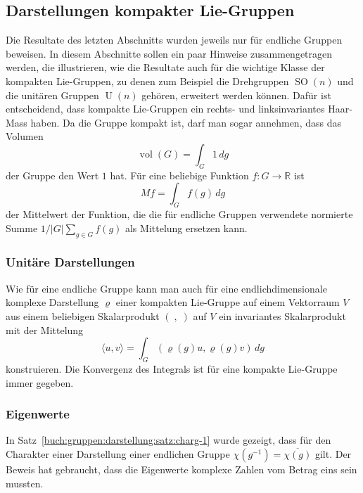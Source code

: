 %
%
%

%
%
\subsection{Darstellungen kompakter Lie-Gruppen}
Die Resultate des letzten Abschnitts wurden jeweils nur für endliche Gruppen
beweisen.
In diesem Abschnitte sollen ein paar Hinweise zusammengetragen werden,
die illustrieren, wie die Resultate auch für die wichtige Klasse
der kompakten Lie-Gruppen, zu denen zum Beispiel die Drehgruppen
$\operatorname{SO}(n)$ und die unitären Gruppen $\operatorname{U}(n)$
gehören, erweitert werden können.
Dafür ist entscheidend, dass kompakte Lie-Gruppen ein rechts- und
linksinvariantes Haar-Mass haben.
Da die Gruppe kompakt ist, darf man sogar annehmen, dass das
Volumen
\[
\operatorname{vol}(G)
=
\int_G 1\, dg
\]
der Gruppe den Wert $1$ hat.
Für eine beliebige Funktion $f\colon G\to \mathbb{R}$ ist
\[
Mf
=
\int_G f(g)\,dg
\]
der Mittelwert der Funktion, die die für endliche Gruppen verwendete
normierte Summe $1/|G| \sum_{g\in G}f(g)$ als Mittelung ersetzen kann.

%
%
\subsubsection{Unitäre Darstellungen}
Wie für eine endliche Gruppe kann man auch für eine endlichdimensionale
komplexe Darstellung $\varrho$ einer kompakten Lie-Gruppe auf einem
Vektorraum $V$ aus einem beliebigen Skalarprodukt $(\;,\;)$ auf $V$
ein invariantes Skalarprodukt mit der Mittelung
\begin{equation}
\langle u,v\rangle
=
\int_G (\varrho(g)u,\varrho(g)v)\,dg
\label{buch:gruppen:darstellungen:eqn:invskalarprodukt}
\end{equation}
konstruieren.
Die Konvergenz des Integrals ist für eine kompakte Lie-Gruppe immer 
gegeben.


%
%
\subsubsection{Eigenwerte}
In Satz~\ref{buch:gruppen:darstellung:satz:charg-1} wurde gezeigt,
dass für den Charakter einer Darstellung einer endlichen Gruppe
$\chi(g^{-1})=\overline{\chi(g)}$ gilt.
Der Beweis hat gebraucht, dass die Eigenwerte komplexe Zahlen vom
Betrag eins sein mussten.

